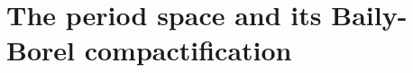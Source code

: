 \documentclass[11pt]{amsart}
\numberwithin{equation}{section}
\theoremstyle{plain}
\theoremstyle{remark}
\newtheorem{remark}[theorem]{Remark}
\theoremstyle{definition}
\newcommand{\sF}{\mathscr{F}}
\newcommand{\cit}[1]{{\rm \textbf{#1}}}
\newcommand{\Ref}[2]{\cit{%
\ifthenelse{\equal{#1}{thm}}{Theorem}{}%
\ifthenelse{\equal{#1}{ass}}{Assumption}{}%
\ifthenelse{\equal{#1}{chp}}{Chapter}{}%
\ifthenelse{\equal{#1}{prp}}{Proposition}{}%
\ifthenelse{\equal{#1}{lmm}}{Lemma}{}%
\ifthenelse{\equal{#1}{cnj}}{Conjecture}{}%
\ifthenelse{\equal{#1}{crl}}{Corollary}{}%
\ifthenelse{\equal{#1}{dfn}}{Definition}{}%
\ifthenelse{\equal{#1}{expl}}{Example}{}%
\ifthenelse{\equal{#1}{hyp}}{Hypothesis}{}%
\ifthenelse{\equal{#1}{rmk}}{Remark}{}%
\ifthenelse{\equal{#1}{clm}}{Claim}{}%
\ifthenelse{\equal{#1}{notconv}}{Notation/Convention}{}%
\ifthenelse{\equal{#1}{pred}}{Prediction}{}%
\ifthenelse{\equal{#1}{prb}}{Problem}{}%
\ifthenelse{\equal{#1}{table}}{Table}{}%
\ifthenelse{\equal{#1}{exe}}{Exercise}{}%
\ifthenelse{\equal{#1}{qst}}{Question}{}%
\ifthenelse{\equal{#1}{rcp}}{Recipe}{}%
\ifthenelse{\equal{#1}{sec}}{Section}{}%
\ifthenelse{\equal{#1}{subsec}}{Subsection}{}%
\ifthenelse{\equal{#1}{subsubsec}}{Subsubsection}{}%
\ifthenelse{\equal{#1}{univ}}{Universal Property}{}%
\ifthenelse{\equal{#1}{trm}}{Terminology}{}%
\ifthenelse{\equal{#1}{tbl}}{Table}{}%
\  \ref{#1:#2}%
}}
\begin{document}






\section{The period space and its Baily-Borel compactification}\label{sec:preliminaries}
%
\end{document}
